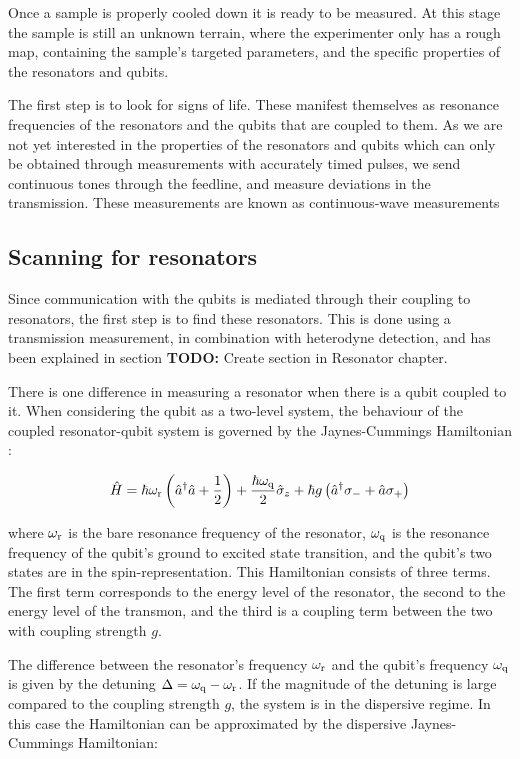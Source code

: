       Once a sample is properly cooled down it is ready to be measured. At this stage the sample is still an unknown terrain, where the experimenter only has a rough map, containing the sample's targeted parameters, and the specific properties of the resonators and qubits.

      The first step is to look for signs of life. These manifest themselves as resonance frequencies of the resonators and the qubits that are coupled to them. As we are not yet interested in the properties of the resonators and qubits which can only be obtained through measurements with accurately timed pulses, we send continuous tones through the feedline, and measure deviations in the transmission. These measurements are known as continuous-wave measurements

      \subsection{Scanning for resonators}
        \label{sec:resonator-scan}
        Since communication with the qubits is mediated through their coupling to resonators, the first step is to find these resonators. This is done using a transmission measurement, in combination with heterodyne detection, and has been explained in section \textbf{TODO:} Create section in Resonator chapter.

        There is one difference in measuring a resonator when there is a qubit coupled to it. When considering the qubit as a two-level system, the behaviour of the coupled resonator-qubit system is governed by the Jaynes-Cummings Hamiltonian \cite{Reed}:

        \begin{equation}
          \hat{H} = \hbar \omega_\text{r}\left(\hat{a}^\dagger \hat{a} + \frac{1}{2} \right) + \frac{\hbar \omega_\text{q}}{2}\hat{\sigma}_z + \hbar g \left(\hat{a}^\dagger \sigma_{-} + \hat{a}\sigma_{+}\right)
          \label{eq:Jaynes-Cummings}
        \end{equation}

        where $\omega_\text{r}$ is the bare resonance frequency of the resonator, $\omega_\text{q}$ is the resonance frequency of the qubit's ground to excited state transition, and the qubit's two states are in the spin-representation. This Hamiltonian consists of three terms. The first term corresponds to the energy level of the resonator, the second to the energy level of the transmon, and the third is a coupling term between the two with coupling strength $g$.

        The difference between the resonator's frequency $\omega_\text{r}$ and the qubit's frequency $\omega_\text{q}$ is given by the detuning $\Delta = \omega_\text{q} - \omega_\text{r}$. If the magnitude of the detuning is large compared to the coupling strength $g$, the system is in the dispersive regime. In this case the Hamiltonian can be approximated by the dispersive Jaynes-Cummings Hamiltonian:

